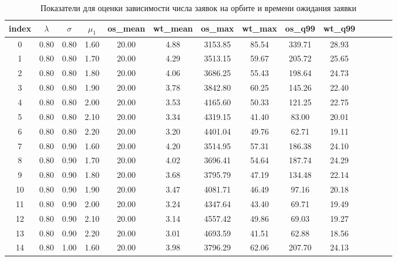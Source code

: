 \begin{table}[H] 
	\centering
	\caption{Показатели для оценки зависимости числа заявок на орбите и времени ожидания заявки}
	\label{sim_result_1}
\begin{tabular}{|c|c|c|c|c|c|c|c|c|c|c|c|c|c|} 
\hline
index & $\lambda$ &  $\sigma$ &  $\mu_1$ &   os\_mean &   wt\_mean &      os\_max &     wt\_max &       os\_q99 &     wt\_q99 \\
\hline
0  &             0.80 &             0.80 &            1.60 &    20.00 &     4.88 & 3153.85 &   85.54 &  339.71 &   28.93 \\
\hline
1  &             0.80 &             0.80 &            1.70 &    20.00 &     4.29 & 3513.15 &   59.67 &  205.72 &   25.65 \\
\hline
2  &             0.80 &             0.80 &            1.80 &    20.00 &     4.06 & 3686.25 &   55.43 &  198.64 &   24.73 \\
\hline
3  &             0.80 &             0.80 &            1.90 &    20.00 &     3.78 & 3842.80 &   60.25 &  145.26 &   22.40 \\
\hline
4  &             0.80 &             0.80 &            2.00 &    20.00 &     3.53 & 4165.60 &   50.33 &  121.25 &   22.75 \\
\hline
5  &             0.80 &             0.80 &            2.10 &    20.00 &     3.34 & 4319.15 &   41.40 &   83.00 &   20.01 \\
\hline
6  &             0.80 &             0.80 &            2.20 &    20.00 &     3.20 & 4401.04 &   49.76 &   62.71 &   19.11 \\
\hline
7  &             0.80 &             0.90 &            1.60 &    20.00 &     4.20 & 3514.95 &   57.31 &  186.38 &   24.10 \\
\hline
8  &             0.80 &             0.90 &            1.70 &    20.00 &     4.02 & 3696.41 &   54.64 &  187.74 &   24.29 \\
\hline
9  &             0.80 &             0.90 &            1.80 &    20.00 &     3.68 & 3795.79 &   47.19 &  134.48 &   22.14 \\
\hline
10 &             0.80 &             0.90 &            1.90 &    20.00 &     3.47 & 4081.71 &   46.49 &   97.16 &   20.18 \\
\hline
11 &             0.80 &             0.90 &            2.00 &    20.00 &     3.24 & 4347.64 &   43.40 &   69.71 &   19.49 \\
\hline
12 &             0.80 &             0.90 &            2.10 &    20.00 &     3.14 & 4557.42 &   49.86 &   69.03 &   19.27 \\
\hline
13 &             0.80 &             0.90 &            2.20 &    20.00 &     3.01 & 4693.59 &   41.51 &   62.88 &   18.56 \\
\hline
14 &             0.80 &             1.00 &            1.60 &    20.00 &     3.98 & 3796.29 &   62.06 &  207.70 &   24.13 \\
\hline
\end{tabular}
\end{table}

